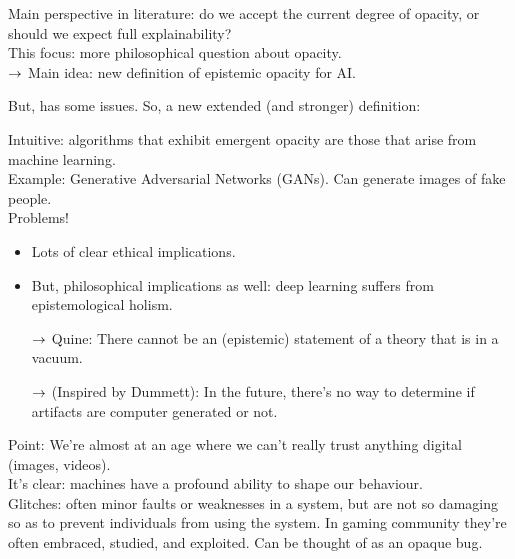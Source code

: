 Main perspective in literature: do we accept the current degree of opacity, or should we expect full explainability? \\

This focus: more philosophical question about opacity. \\

$\rightarrow$ Main idea: new definition of epistemic opacity for AI. \\


But, has some issues. So, a new extended (and stronger) definition:


Intuitive: algorithms that exhibit emergent opacity are those that arise from machine learning. \\

Example: Generative Adversarial Networks (GANs). Can generate images of fake people. \\

Problems!
\begin{itemize}
\item Lots of clear ethical implications.
\item But, philosophical implications as well: deep learning suffers from epistemological holism.

$\rightarrow$ Quine: There cannot be an (epistemic) statement of a theory that is in a vacuum.

$\rightarrow$ (Inspired by Dummett): In the future, there's no way to determine if artifacts are computer generated or not.
\end{itemize}

Point: We're almost at an age where we can't really trust anything digital (images, videos). \\

It's clear: machines have a profound ability to shape our behaviour. \\

Glitches: often minor faults or weaknesses in a system, but are not so damaging so as to prevent individuals from using the system. In gaming community they're often embraced, studied, and exploited. Can be thought of as an opaque bug. \\

